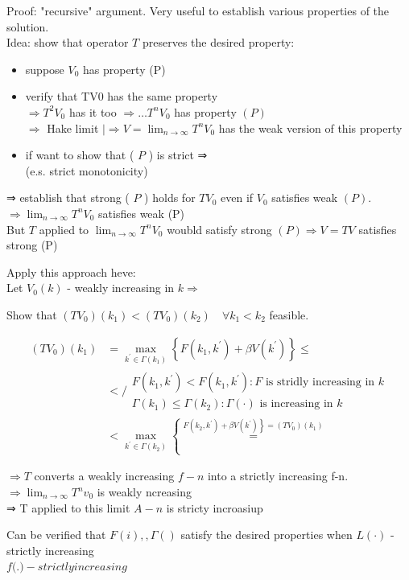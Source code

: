 \documentclass[10pt]{article}
\begin{document}
Proof: "recursive" argument. Very useful to establish various properties of the solution.\\
Idea: show that operator $T$ preserves the desired property:

\begin{itemize}
  \item suppose $V_{0}$ has property (P)
  \item verify that TV0 has the same property\\
$\Rightarrow T^{2} V_{0}$ has it too $\Rightarrow \ldots T^{n} V_{0}$ has property $(P)$\\
$\Rightarrow$ Hake limit $\mid \Rightarrow V=\lim _{n \rightarrow \infty} T^{n} V_{0}$ has the weak version of this property
  \item if want to show that ( $P$ ) is strict ⇒\\
(e.s. strict monotonicity)
\end{itemize}

⇒ establish that strong ( $P$ ) holds for $T V_{0}$ even if $V_{0}$ satisfies weak $(P)$.\\
$\Rightarrow \lim _{n \rightarrow \infty} T^{n} V_{0}$ satisfies weak (P)\\
But $T$ applied to $\lim _{n \rightarrow \infty} T^{n} V_{0}$ woubld satisfy strong $(P) \Rightarrow V=T V$ satisfies strong (P)

Apply this approach heve:\\
Let $V_{0}(k)$ - weakly increasing in $k \Rightarrow$

Show that $\left(T V_{0}\right)\left(k_{1}\right)<\left(T V_{0}\right)\left(k_{2}\right) \quad \forall k_{1}<k_{2}$ feasible.

$$
\begin{aligned}
\left(T V_{0}\right)\left(k_{1}\right) & =\max _{k^{\prime} \in \Gamma\left(k_{1}\right)}\left\{F\left(k_{1}, k^{\prime}\right)+\beta V\left(k^{\prime}\right)\right\} \leq \\
& </ \begin{array}{l}
F\left(k_{1}, k^{\prime}\right)<F\left(k_{1}, k^{\prime}\right): F \text { is stridly increasing in } k \\
\Gamma\left(k_{1}\right) \leq \Gamma\left(k_{2}\right): \Gamma(\cdot) \text { is increasing in } k
\end{array} \\
& <\max _{k^{\prime} \in \Gamma\left(k_{2}\right)}\left\{\stackrel{\left.F\left(k_{2}, k^{\prime}\right)+\beta V\left(k^{\prime}\right)\right\}=\left(T V_{0}\right)\left(k_{1}\right)}{=}\right.
\end{aligned}
$$

$\Rightarrow T$ converts a weakly increasing $f-n$ into a strictly increasing f-n.\\
$\Rightarrow \lim _{n \rightarrow \infty} T^{n} v_{0}$ is weakly ncreasing\\
⇒ T applied to this limit $A-n$ is stricty incroasiup

Can be verified that $F(i),, \Gamma()$ satisfy the desired properties when $L(\cdot)$ - strictly increasing\\
$f($.$) - strictly increasing$
\end{document}

